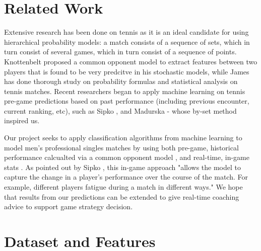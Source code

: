 \documentclass[paper=a4, fontsize=10pt]{scrartcl} %
\numberwithin{equation}{section} %
\numberwithin{figure}{section} %
\numberwithin{table}{section} %
\begin{document}
\section{Related Work}
Extensive research has been done on tennis as it is an ideal candidate for using hierarchical probability models: a match consists of a sequence of sets, which in turn consist of several games, which in turn consist of a sequence of points. Knottenbelt \cite{KNOTTENBELT20123820} proposed a common opponent model to extract features between two players that is found to be very predcitve in his stochastic models, while James \cite{omalley} has done thorough study on probability formulas and statistical analysis on tennis matches. Recent researchers began to apply machine learning on tennis pre-game predictions based on past performance (including previous encounter, current ranking, etc), such as Sipko \cite{tennis1}, and Madurska \cite{tennis2setbyset} - whose by-set method inspired us. 

Our project seeks to apply classification algorithms from machine learning to model men's professional singles matches by using both pre-game, historical performance calcualted via a common opponent model \cite{KNOTTENBELT20123820}, and real-time, in-game stats \cite{tennis_charting} \cite{tennis2setbyset}. As pointed out by Sipko \cite{tennis1}, this in-game approach "allows the model to capture the change in a player's performance over the course of the match. For example, different players fatigue during a match in different ways." We hope that results from our predictions can be extended to give real-time coaching advice to support game strategy decision.

\section{Dataset and Features}
\end{document}
